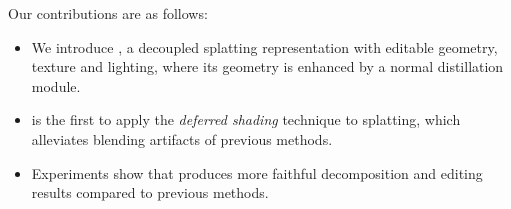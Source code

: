 Our contributions are as follows:
\begin{itemize}
    \item We introduce \name, a decoupled  splatting representation with editable geometry, texture and lighting, where its geometry is enhanced by a normal distillation module. 
    \item {} \name is the first to apply the \textit{deferred shading} technique to  splatting, which alleviates blending artifacts of previous methods.
    \item Experiments show that  \name produces more faithful decomposition and editing results compared to previous methods. 
\end{itemize}
